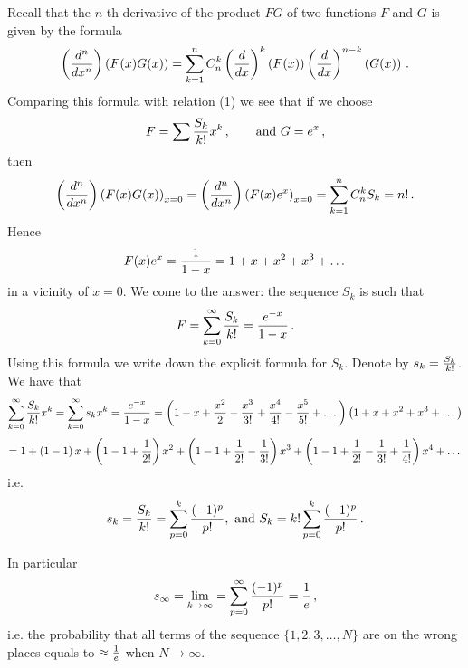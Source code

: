 Recall that the  $n$-th derivative of the product $FG$ of two functions
$F$ and $G$ is given by the formula
        $$
     \left( d^n\over dx^n\right)\left(F(x)G(x)\right)=
     \sum_{k=1}^n C^k_n\left( d\over dx\right)^k\left( F(x)\right)
        \left( d\over dx\right)^{n-k}\left(G(x)\right)\,.
       $$ 
 Comparing this formula with relation (1) we see that if we choose 
       $$
F=\sum {S_k\over k!} x^k\,,\qquad {\rm and }\,\,   G=e^x\,,
       $$
  then
         $$
     \left( d^n\over dx^n\right)\left(F(x)G(x)\right)_{x=0}=
      \left( d^n\over dx^n\right)\left(F(x)e^x\right)_{x=0}=
   \sum_{k=1}^n C^k_n S_k=n!\,.
         $$
Hence
        $$
F(x)e^x={1\over 1-x}=1+x+x^2+x^3+\dots
        $$
in a vicinity of $x=0$. We come to the answer:
       the sequence $S_k$ is such that
       $$
F=\sum_{k=0}^\infty {S_k\over k!} ={e^{-x}\over 1-x}\,.
        $$
Using this formula we write down the explicit formula for $S_k$.
Denote by $s_k={S_k\over k!}$. We have that
          $$
\sum_{k=0}^\infty {S_k\over k!}x^k=\sum_{k=0}^\infty s_kx^k={e^{-x}\over 1-x}=
\left(1-x+{x^2\over 2}-{x^3\over 3!}+
{x^4\over 4!}-{x^5\over 5!}+\dots\right)
\left(1+x+x^2+x^3+\dots\right)
          $$
        $$
=1+\left(1-1\right)x+\left(1-1+{1\over 2!}\right)x^2+
   \left(1-1+{1\over 2!}-{1\over 3!}\right)x^3+
\left(1-1+{1\over 2!}-{1\over 3!}+{1\over 4!}\right)x^4+\dots
        $$
i.e.
         $$
    s_k={S_k\over k!}=\sum_{p=0}^k {(-1)^p\over p!},\,\,
        {\rm and}\,\, S_k=k!\sum_{p=0}^k {(-1)^p\over p!}\,.
         $$
    
In particular
          $$
         s_\infty=\lim_{k\to\infty}=
\sum_{p=0}^\infty {(-1)^p\over p!}={1\over e}\,,
           $$
i.e. the probability that all terms of the sequence 
  $\{1,2,3,\dots,N\}$
are on the wrong places equals to $\approx {1\over e}$ when $N\to \infty$.


\bye

